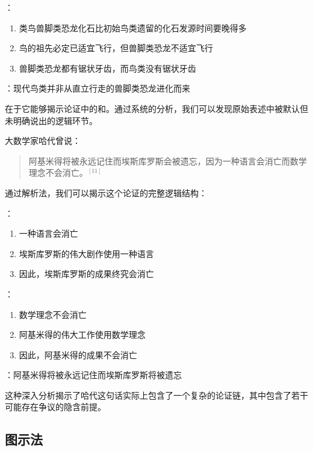 \begin{examplebox}[title=解析后的论证结构]
：
\begin{enumerate}
  \item 类鸟兽脚类恐龙化石比初始鸟类遗留的化石发源时间要晚得多
  \item 鸟的祖先必定已适宜飞行，但兽脚类恐龙不适宜飞行
  \item 兽脚类恐龙都有锯状牙齿，而鸟类没有锯状牙齿
\end{enumerate}

：现代鸟类并非从直立行走的兽脚类恐龙进化而来
\end{examplebox}

在于它能够揭示论证中的和。通过系统的分析，我们可以发现原始表述中被默认但未明确说出的逻辑环节。

\begin{examplebox}[title=揭示隐含前提的例子]
大数学家哈代曾说：
\begin{quotation}
阿基米得将被永远记住而埃斯库罗斯会被遗忘，因为一种语言会消亡而数学理念不会消亡。${}^{[11]}$
\end{quotation}

通过解析法，我们可以揭示这个论证的完整逻辑结构：

：
\begin{enumerate}
  \item 一种语言会消亡
  \item 埃斯库罗斯的伟大剧作使用一种语言
  \item 因此，埃斯库罗斯的成果终究会消亡
\end{enumerate}

：
\begin{enumerate}
  \item 数学理念不会消亡
  \item 阿基米得的伟大工作使用数学理念
  \item 因此，阿基米得的成果不会消亡
\end{enumerate}

：阿基米得将被永远记住而埃斯库罗斯将被遗忘
\end{examplebox}

这种深入分析揭示了哈代这句话实际上包含了一个复杂的论证链，其中包含了若干可能存在争议的隐含前提。

\subsection{图示法}

